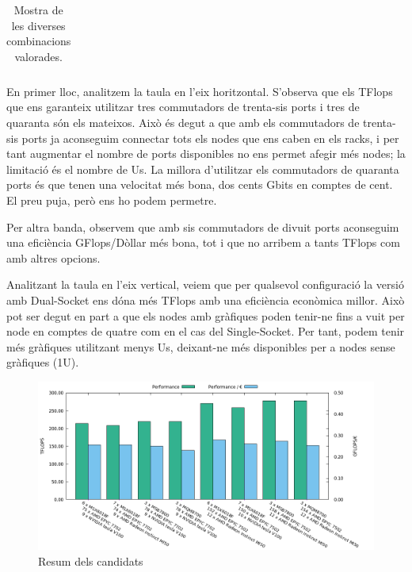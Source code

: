 \begin{table}[H]
\begin{adjustwidth}{-1.0in}{-1.0in}
\begin{center}
\begin{tabular}{llc|c|c|c}
\end{tabular}
\caption{Mostra de les diverses combinacions valorades.}
\end{center}
\end{adjustwidth}
\end{table}

En primer lloc, analitzem la taula en l'eix horitzontal. S'observa que els TFlops que ens garanteix utilitzar tres commutadors de trenta-sis ports i tres de quaranta són els mateixos. Això és degut a que amb els commutadors de trenta-sis ports ja aconseguim connectar tots els nodes que ens caben en els racks, i per tant augmentar el nombre de ports disponibles no ens permet afegir més nodes; la limitació és el nombre de Us. La millora d'utilitzar els commutadors de quaranta ports és que tenen una velocitat més bona, dos cents Gbits en comptes de cent. El preu puja, però ens ho podem permetre.

Per altra banda, observem que amb sis commutadors de divuit ports aconseguim una eficiència GFlops/Dòllar més bona, tot i que no arribem a tants TFlops com amb altres opcions.

Analitzant la taula en l'eix vertical, veiem que per qualsevol configuració la versió amb Dual-Socket ens dóna més TFlops amb una eficiència econòmica millor. Això pot ser degut en part a que els nodes amb gràfiques poden tenir-ne fins a vuit per node en comptes de quatre com en el cas del Single-Socket. Per tant, podem tenir més gràfiques utilitzant menys Us, deixant-ne més disponibles per a nodes sense gràfiques (1U).

\begin{figure}[H]
    \centering
    \includegraphics[width=\textwidth]{img/summary}
    \caption{Resum dels candidats}
    \label{fig:summary}
\end{figure}
